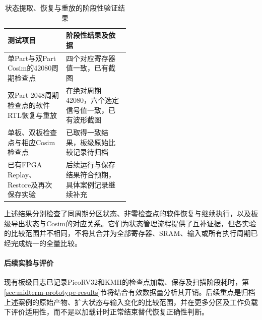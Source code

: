 \begin{table}[htbp]
    \centering
    \caption{状态提取、恢复与重放的阶段性验证结果}
    \label{tab:midterm-state-replay-tests}
    \small
    \renewcommand{\arraystretch}{1.25}
    \begin{tabularx}{\linewidth}{@{}>{\raggedright\arraybackslash}p{0.48\linewidth}>{\raggedright\arraybackslash}X@{}}
        \toprule
        测试项目 & 阶段性结果及依据 \\
        \midrule
        单Part与双Part Cosim的42080周期检查点 & 四个对应寄存器值一致，已有截图 \\
        双Part 2048周期检查点的软件RTL恢复与重放 & 在绝对周期42080，六个选定信号值一致，已有波形截图 \\
        单板、双板检查点与相应Cosim检查点 & 已取得一致结果，板级原始比较记录待归档 \\
        已有FPGA Replay、Restore及再次保存实验 & 后续运行与保存结果符合预期，具体案例记录继续补充 \\
        \bottomrule
    \end{tabularx}
\end{table}

上述结果分别检查了同周期分区状态、非零检查点的软件恢复与继续执行，以及板级导出状态与Cosim的对应关系。它们为状态管理流程提供了互补证据，但各实验的比较范围并不相同，不将其合并为全部寄存器、SRAM、输入或所有执行周期已经完成统一的全量比较。


\paragraph{后续实验与评价}

现有板级日志已记录PicoRV32和KMH的检查点加载、保存及扫描阶段耗时，第\ref{sec:midterm-prototype-results}节将结合有效数据量分析其开销。后续重点是归档上述案例的原始产物、扩大状态与输入变化的比较范围，并在更多分区及工作负载下评价适用性，而不是以加载计时正常结束替代恢复正确性判断。

